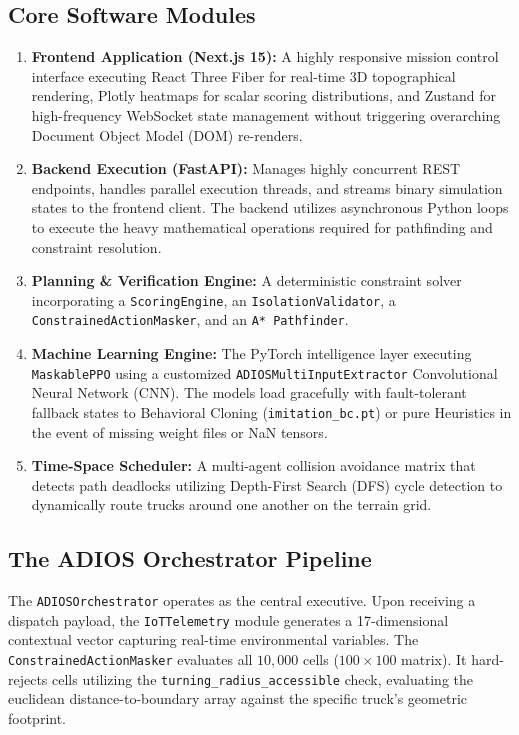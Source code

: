 \documentclass[conference]{IEEEtran}
\begin{document}
\subsection{Core Software Modules}
\begin{enumerate}
    \item \textbf{Frontend Application (Next.js 15):} A highly responsive mission control interface executing React Three Fiber for real-time 3D topographical rendering, Plotly heatmaps for scalar scoring distributions, and Zustand for high-frequency WebSocket state management without triggering overarching Document Object Model (DOM) re-renders.
    \item \textbf{Backend Execution (FastAPI):} Manages highly concurrent REST endpoints, handles parallel execution threads, and streams binary simulation states to the frontend client. The backend utilizes asynchronous Python loops to execute the heavy mathematical operations required for pathfinding and constraint resolution.
    \item \textbf{Planning \& Verification Engine:} A deterministic constraint solver incorporating a \texttt{ScoringEngine}, an \texttt{IsolationValidator}, a \texttt{ConstrainedActionMasker}, and an \texttt{A* Pathfinder}.
    \item \textbf{Machine Learning Engine:} The PyTorch intelligence layer executing \texttt{MaskablePPO} using a customized \texttt{ADIOSMultiInputExtractor} Convolutional Neural Network (CNN). The models load gracefully with fault-tolerant fallback states to Behavioral Cloning (\texttt{imitation\_bc.pt}) or pure Heuristics in the event of missing weight files or NaN tensors.
    \item \textbf{Time-Space Scheduler:} A multi-agent collision avoidance matrix that detects path deadlocks utilizing Depth-First Search (DFS) cycle detection to dynamically route trucks around one another on the terrain grid.
\end{enumerate}

\subsection{The ADIOS Orchestrator Pipeline}
The \texttt{ADIOSOrchestrator} operates as the central executive. Upon receiving a dispatch payload, the \texttt{IoTTelemetry} module generates a 17-dimensional contextual vector capturing real-time environmental variables. The \texttt{ConstrainedActionMasker} evaluates all $10,000$ cells ($100 \times 100$ matrix). It hard-rejects cells utilizing the \texttt{turning\_radius\_accessible} check, evaluating the euclidean distance-to-boundary array against the specific truck's geometric footprint. 
\end{document}
